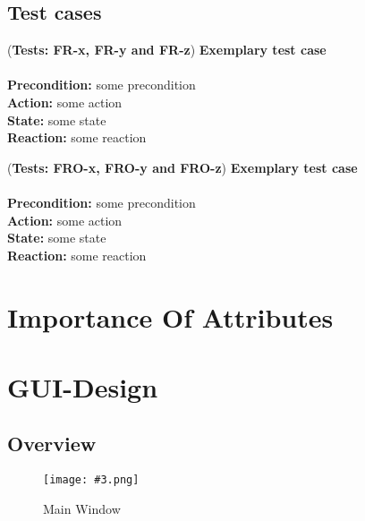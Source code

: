 \documentclass[10pt,a4paper]{report}
\newcommand{\precondition}[1]{
    \textbf{Precondition: } #1 \leavevmode \\
}
\newcommand{\action}[1]{
    \textbf{Action: } #1 \leavevmode \\
}
\newcommand{\state}[1]{
    \textbf{State: } #1 \leavevmode \\
}
\newcommand{\reaction}[1]{
    \textbf{Reaction: } #1 \leavevmode \\
}
\newcommand{\GTCDescription}[2]{
    (\textbf{Tests: #1}) \textbf{#2} \leavevmode \\
}
\newcommand{\GTCODescription}[2]{
    (\textbf{Tests: #1}) \textbf{#2} \leavevmode \\
}
\newcommand{\includeimage}[5]{
    \begin{figure}[H]
        #1
        \texttt{[image: \#3.png]}
        \caption{#4}
        \label{fig:#5}
    \end{figure}
}
\begin{document}
\section{Test cases}
\begin{GTC}
    \item \GTCDescription{FR-x, FR-y and FR-z}{Exemplary test case} \leavevmode \\ \precondition{some precondition}\action{some action}\state{some state}\reaction{some reaction}
\end{GTC}
\begin{GTCO}
    \item \GTCODescription{FRO-x, FRO-y and FRO-z}{Exemplary test case} \leavevmode \\ \precondition{some precondition}\action{some action}\state{some state}\reaction{some reaction}
\end{GTCO}

\chapter{Importance Of Attributes}

\chapter{GUI-Design}
\section{Overview}
\includeimage{}{0.4}{Main Window}{Main Window}{main_window}

\end{document}
